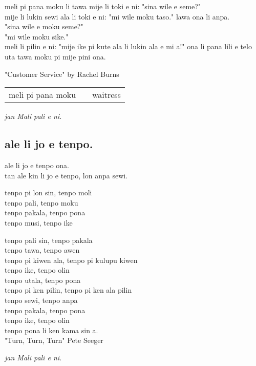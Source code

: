 meli pi pana moku li tawa mije li toki e ni: "sina wile e seme?" \\
mije li lukin sewi ala li toki e ni: "mi wile moku taso." lawa ona li anpa. \\
"sina wile e moku seme?" \\
"mi wile moku sike." \\
meli li pilin e ni: "mije ike pi kute ala li lukin ala e mi a!"
ona li pana lili e telo uta tawa moku pi mije pini ona.

"Customer Service" by Rachel Burns

\begin{supertabular}{p{5,5cm}|ll}
meli pi pana moku && waitress \\
\end{supertabular}

\textit{jan Mali pali e ni. \cite{www:astrodonunt:01}}

\subsection{ale li jo e tenpo.}

ale li jo e tenpo ona. \\
tan ale kin li jo e tenpo, lon anpa sewi.

tenpo pi lon sin, tenpo moli \\
tenpo pali, tenpo moku \\
tenpo pakala, tenpo pona \\
tenpo musi, tenpo ike

tenpo pali sin, tenpo pakala \\
tenpo tawa, tenpo awen \\
tenpo pi kiwen ala, tenpo pi kulupu kiwen \\

tenpo ike, tenpo olin \\
tenpo utala, tenpo pona \\
tenpo pi ken pilin, tenpo pi ken ala pilin \\

tenpo sewi, tenpo anpa \\
tenpo pakala, tenpo pona \\
tenpo ike, tenpo olin \\
tenpo pona li ken kama sin a. \\

"Turn, Turn, Turn" Pete Seeger 

\textit{jan Mali pali e ni. \cite{www:astrodonunt:01}}

